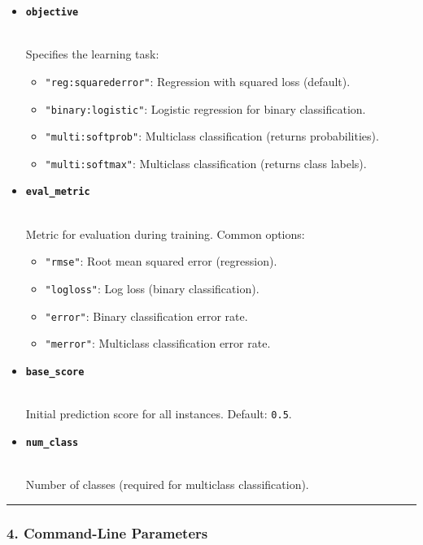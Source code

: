 \documentclass[12pt]{book}
\providecommand{\tightlist}{%
  \setlength{\itemsep}{0pt}\setlength{\parskip}{0pt}}
\begin{document}
\begin{itemize}
\item
  \textbf{\texttt{objective}}\strut \\
  Specifies the learning task:

  \begin{itemize}
  \tightlist
  \item
    \texttt{"reg:squarederror"}: Regression with squared loss (default).
  \item
    \texttt{"binary:logistic"}: Logistic regression for binary
    classification.
  \item
    \texttt{"multi:softprob"}: Multiclass classification (returns
    probabilities).
  \item
    \texttt{"multi:softmax"}: Multiclass classification (returns class
    labels).
  \end{itemize}
\item
  \textbf{\texttt{eval\_metric}}\strut \\
  Metric for evaluation during training. Common options:

  \begin{itemize}
  \tightlist
  \item
    \texttt{"rmse"}: Root mean squared error (regression).
  \item
    \texttt{"logloss"}: Log loss (binary classification).
  \item
    \texttt{"error"}: Binary classification error rate.
  \item
    \texttt{"merror"}: Multiclass classification error rate.
  \end{itemize}
\item
  \textbf{\texttt{base\_score}}\strut \\
  Initial prediction score for all instances. Default: \texttt{0.5}.
\item
  \textbf{\texttt{num\_class}}\strut \\
  Number of classes (required for multiclass classification).
\end{itemize}

\begin{center}\rule{0.5\linewidth}{0.5pt}\end{center}

\subsubsection{\texorpdfstring{\textbf{4. Command-Line
Parameters}}{4. Command-Line Parameters}}\label{command-line-parameters}
\end{document}
